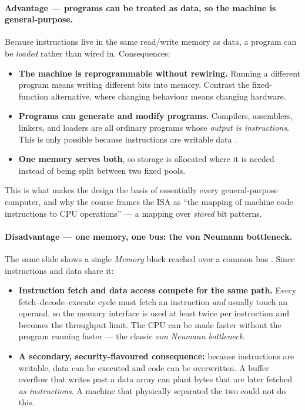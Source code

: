 \paragraph{Advantage — programs can be treated as data, so the machine is general-purpose.}

Because instructions live in the same read/write memory as data, a program can
be \emph{loaded} rather than wired in. Consequences:

\begin{itemize}
  \item \textbf{The machine is reprogrammable without rewiring.} Running a
    different program means writing different bits into memory. Contrast the
    fixed-function alternative, where changing behaviour means changing
    hardware.
  \item \textbf{Programs can generate and modify programs.} Compilers,
    assemblers, linkers, and loaders are all ordinary programs whose
    \emph{output is instructions}. This is only possible because instructions
    are writable data .
  \item \textbf{One memory serves both}, so storage is allocated where it is
    needed instead of being split between two fixed pools.
\end{itemize}

This is what makes the design the basis of essentially every general-purpose
computer, and why the course frames the ISA as ``the mapping of machine code
instructions to CPU operations''  — a mapping over \emph{stored}
bit patterns.

\paragraph{Disadvantage — one memory, one bus: the von Neumann bottleneck.}

The same slide shows a single \emph{Memory} block reached over a common bus
. Since instructions and data share it:

\begin{itemize}
  \item \textbf{Instruction fetch and data access compete for the same path.}
    Every fetch--decode--execute cycle  must fetch an
    instruction \emph{and} usually touch an operand, so the memory interface is
    used at least twice per instruction and becomes the throughput limit. The
    CPU can be made faster without the program running faster — the classic
    \emph{von Neumann bottleneck}.
  \item \textbf{A secondary, security-flavoured consequence:} because
    instructions are writable, data can be executed and code can be overwritten.
    A buffer overflow that writes past a data array can plant bytes that are
    later fetched \emph{as instructions}. A machine that physically separated
    the two could not do this.
\end{itemize}

